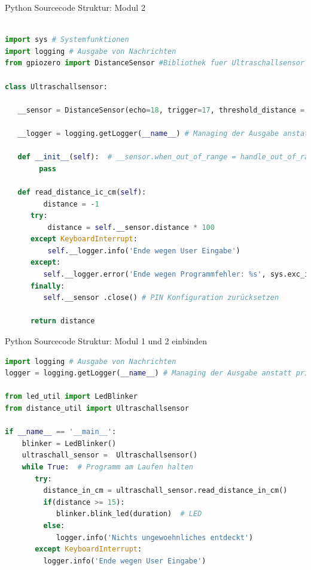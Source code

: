 \begin{frame}[fragile]{Python Sourcecode Struktur: Modul 2}
\begin{lstlisting}[language=Python]

import sys # Systemfunktionen
import logging # Ausgabe von Nachrichten
from gpiozero import DistanceSensor #Bibliothek fuer Ultraschallsensor

class Ultraschallsensor:
	 
   __sensor = DistanceSensor(echo=18, trigger=17, threshold_distance = 0.1, max_distance=1) #  Sensor Kontrolle für GPIO PIN  Input 17 und Output 18 an private Variable zuweisen
   
   __logger = logging.getLogger(__name__) # Managing der Ausgabe anstatt print() Funktion
   
   def __init__(self):  # __sensor.when_out_of_range = handle_out_of_range # Funktion, die z.B. loggt
        pass
   
   def read_distance_ic_cm(self):
         distance = -1
      try:
          distance = self.__sensor.distance * 100
      except KeyboardInterrupt:  
          self.__logger.info('Ende wegen User Eingabe')
      except:  
         self.__logger.error('Ende wegen Programmfehler: %s', sys.exc_info()[0]) # siehe https://docs.python.org/3/tutorial/errors.html
      finally:  
         self.__sensor .close() # PIN Konfiguration zurücksetzen
         
      return distance

\end{lstlisting}
\end{frame}

\begin{frame}[fragile]{Python Sourcecode Struktur: Modul 1  und 2 einbinden}
\begin{lstlisting}[language=Python]
import logging # Ausgabe von Nachrichten
logger = logging.getLogger(__name__) # Managing der Ausgabe anstatt print() Funktion

from led_util import LedBlinker
from distance_util import Ultraschallsensor

if __name__ == '__main__':
    blinker = LedBlinker()
    ultraschall_sensor =  Ultraschallsensor()
    while True:  # Programm am Laufen halten
       try:
         distance_in_cm = ultraschall_sensor.read_distance_in_cm()
         if(distance >= 15):
            blinker.blink_led(duration)  # LED
         else:
            logger.info('Nichts ungewoehnliches entdeckt') 
       except KeyboardInterrupt:  
         logger.info('Ende wegen User Eingabe')

\end{lstlisting}
\end{frame}




